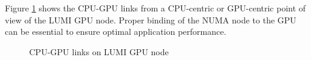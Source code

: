 Figure \ref{fig_lumig_cpu_gpu_links} shows the CPU-GPU links from a CPU-centric or GPU-centric point of view of the LUMI GPU node. Proper binding of the NUMA node to the GPU can be essential to ensure optimal application performance.

\begin{figure}[H]
    \centering
    \caption{CPU-GPU links on LUMI GPU node \cite{lumi}}
    \label{fig_lumig_cpu_gpu_links}
\end{figure}
